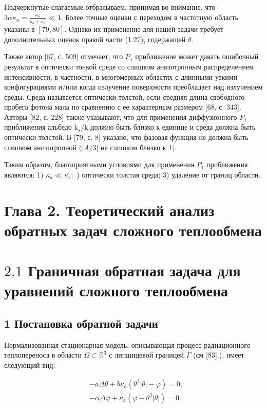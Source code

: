 \documentclass[10pt]{article}
\begin{document}
Подчеркнутые слагаемые отбрасываем, принимая во внимание, что $3 \alpha \kappa_{a}=\frac{\kappa_{a}}{\kappa_{a}+\kappa_{s}^{\prime}} \ll 1$. Более точные оценки с переходом в частотную область указаны в $[79,80]$. Однако их применение для нашей задачи требует дополнительных оценок правой части (1.27), содержащей $\theta$.

Также автор [67, с. 509] отмечает, что $P_{1}$ приближение может давать ошибочный результат в оптически тонкой среде со слишком анизотропным распределением интенсивности, в частности, в многомерных областях с длинными узкими конфигурациями и/или когда излучение поверхности преобладает над излучением среды. Среда называется оптически толстой, если средняя длина свободного пробега фотона мала по сравнению с ее характерным размером [68, с. 343]. Авторы $[82$, с. 228] также указывают, что для применения диффузионного $P_{1}$ приближения альбедо $\mathrm{k}_{s} / \mathrm{k}$ должно быть близко к единице и среда должна быть оптически толстой. В [79, с. 8] указано, что фазовая функция не должна быть слишком анизотропной $(|A / 3|$ не слишком близко к 1$)$.

Таким образом, благоприятными условиями для применения $P_{1}$ приближения являются: 1) $\kappa_{a} \ll \kappa_{s}^{\prime} ;$ ) оптически толстая среда; 3) удаление от границ области.

\section{Глава 2. Теоретический анализ обратных задач сложного теплообмена}
\section{$2.1$ Граничная обратная задача для уравнений сложного теплообмена}
\subsection{1 Постановка обратной задачи}
Нормализованная стационарная модель, описывающая процесс радиационного теплопереноса в области $\Omega \subset \mathbb{R}^{3}$ с липшицевой границей $\Gamma$ (см [83].), имеет следующий вид:

$$
\begin{aligned}
&-a \Delta \theta+b \kappa_{a}\left(\theta^{3}|\theta|-\varphi\right)=0, \\
&-\alpha \Delta \varphi+\kappa_{a}\left(\varphi-\theta^{3}|\theta|\right)=0 .
\end{aligned}
$$
\end{document}
